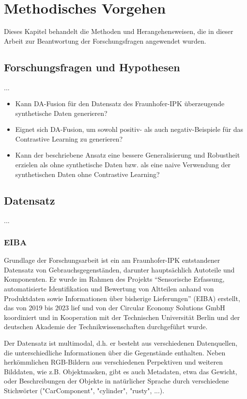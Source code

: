 \chapter{Methodisches Vorgehen}

Dieses Kapitel behandelt die Methoden und Herangehensweisen, die in dieser Arbeit zur Beantwortung der Forschungsfragen angewendet wurden.

\section{Forschungsfragen und Hypothesen}

...

\begin{itemize}[]
	\item Kann DA-Fusion für den Datensatz des Fraunhofer-IPK überzeugende synthetische Daten generieren?
	\item Eignet sich DA-Fusion, um sowohl positiv- als auch negativ-Beispiele für das Contrastive Learning zu generieren?
	\item Kann der beschriebene Ansatz eine bessere Generalisierung und Robustheit erzielen als ohne synthetische Daten bzw. als eine naive Verwendung der synthetischen Daten ohne Contrastive Learning?
\end{itemize}

\section{Datensatz}

...

\subsection{EIBA}

Grundlage der Forschungsarbeit ist ein am Fraunhofer-IPK entstandener Datensatz von Gebrauchsgegenständen, darunter hauptsächlich Autoteile und Komponenten. Er wurde im Rahmen des Projekts “Sensorische Erfassung, automatisierte Identifikation und Bewertung von Altteilen anhand von Produktdaten sowie Informationen über bisherige Lieferungen” (EIBA) erstellt, das von 2019 bis 2023 lief und von der Circular Economy Solutions GmbH koordiniert und in Kooperation mit der Technischen Universität Berlin und der deutschen Akademie der Technikwissenschaften durchgeführt wurde.

Der Datensatz ist multimodal, d.h. er besteht aus verschiedenen Datenquellen, die unterschiedliche Informationen über die Gegenstände enthalten. Neben herkömmlichen RGB-Bildern aus verschiedenen Perpektiven und weiteren Bilddaten, wie z.B. Objektmasken, gibt es auch Metadaten, etwa das Gewicht, oder Beschreibungen der Objekte in natürlicher Sprache durch verschiedene Stichwörter ("CarComponent", "cylinder", "rusty", ...).

